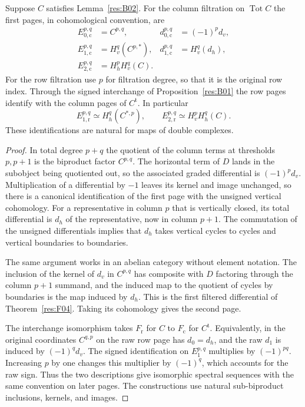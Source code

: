 \begin{proposition}
\label{res:B03}
Suppose \(C\) satisfies Lemma~\ref{res:B02}. For the column filtration
on \(\operatorname{Tot}C\) the first pages, in cohomological convention,
are
\begin{align*}
    E_{0,\mathrm c}^{p,q}&=C^{p,q},
        &d_{0,\mathrm c}^{p,q}&=(-1)^p d_v,\\
    E_{1,\mathrm c}^{p,q}&=H_v^q(C^{p,*}),
        &d_{1,\mathrm c}^{p,q}&=H_v^q(d_h),\\
    E_{2,\mathrm c}^{p,q}&=H_h^p H_v^q(C).
\end{align*}
For the row filtration use \(p\) for filtration degree, so that it is
the original row index. Through the signed interchange of
Proposition~\ref{res:B01} the row pages identify with the column pages
of \(C^{\mathrm t}\). In particular
\[
    E_{1,\mathrm r}^{p,q}\simeq H_h^q(C^{*,p}),
    \qquad
    E_{2,\mathrm r}^{p,q}\simeq H_v^p H_h^q(C).
\]
These identifications are natural for maps of double complexes.
\end{proposition}

\begin{proof}
In total degree \(p+q\) the quotient of the column terms at thresholds
\(p,p+1\) is the biproduct factor \(C^{p,q}\). The horizontal term of \(D\)
lands in the subobject being quotiented out, so the associated graded
differential is \((-1)^p d_v\). Multiplication of a differential by
\(-1\) leaves its kernel and image unchanged, so there is a canonical
identification of the first page with the unsigned vertical cohomology.
For a representative in column \(p\) that is vertically closed, its
total differential is \(d_h\) of the representative, now in column
\(p+1\). The commutation of the unsigned differentials implies that
\(d_h\) takes vertical cycles to cycles and vertical boundaries to
boundaries.

The same argument works in an abelian category without element notation.
The inclusion of the kernel of \(d_v\) in \(C^{p,q}\) has composite
with \(D\) factoring through the column \(p+1\) summand, and the
induced map to the quotient of cycles by boundaries is the map induced
by \(d_h\). This is the first filtered differential of
Theorem~\ref{res:F04}. Taking its cohomology gives the second page.

The interchange isomorphism takes \(F_{\mathrm r}\) for \(C\) to
\(F_{\mathrm c}\) for \(C^{\mathrm t}\). Equivalently, in the original
coordinates \(C^{q,p}\) on the raw row page has \(d_0=d_h\), and the raw
\(d_1\) is induced by \((-1)^q d_v\). The signed identification on
\(E_1^{p,q}\) multiplies by \((-1)^{pq}\). Increasing \(p\) by one changes
this multiplier by \((-1)^q\), which accounts for the raw sign.
Thus the two descriptions give isomorphic spectral sequences with the
same convention on later pages. The constructions use natural
sub-biproduct inclusions, kernels, and images.
\end{proof}

